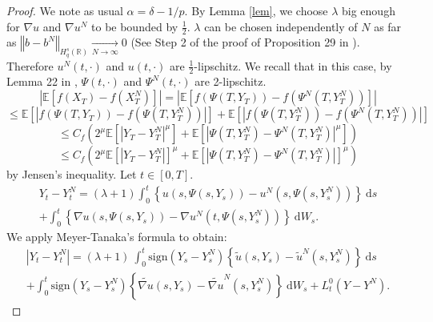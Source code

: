 \documentclass[12pt]{article}
\newcommand{\norme}[1]{\left\Vert #1\right\Vert}
\newcommand{\R}{\mathbb{R}}
\newcommand{\E}{\mathbb{E}}
\newcommand{\di}{\mathrm{d}}
\begin{document}
\begin{proof}
    We note as usual $\alpha = \delta - 1/p$.
    By Lemma \ref{lem}, we choose $\lambda$ big enough for $\nabla u$ and $\nabla u^N$ to be bounded by $\frac{1}{2}$. $\lambda$ can be chosen independently of $N$ as far as $\norme{b - b^N}_{H_q^s(\R)} \underset{N\rightarrow\infty}{\longrightarrow} 0$ (See Step 2 of the proof of Proposition 29 in \cite{Fla-Iss-Rus-2017}). Therefore $u^N(t,\cdot)$ and $u(t,\cdot)$ are $\frac{1}{2}$-lipschitz. We recall that in this case, by Lemma 22 in \cite{Fla-Iss-Rus-2017}, $\Psi(t,\cdot)$ and $\Psi^N(t,\cdot)$ are 2-lipschitz.    
    \begin{equation*}
    \left|\E\left[f\left(X_T\right)-f\left(X_T^N\right)\right]\right| = \left|\E\left[f\left(\Psi\left(T,Y_T\right)\right)-f\left(\Psi^N\left(T,Y_T^N\right)\right)\right]\right|
    \end{equation*}   
    \begin{equation*}
    \leq  \E\left[\left|f\left(\Psi\left(T,Y_T\right)\right)-f\left(\Psi\left(T,Y_T^N\right)\right)\right|\right]+\E\left[\left|f\left(\Psi\left(T,Y_T^N\right)\right)-f\left(\Psi^N\left(T,Y_T^N\right)\right)\right|\right]
    \end{equation*}  
    \begin{equation*}
    \leq C_f  \left(2^\mu\E\left[\left|Y_T-Y_T^N\right|^\mu\right]+\E\left[\left|\Psi\left(T,Y_T^N\right)-\Psi^N\left(T,Y_T^N\right)\right|^\mu\right]\right)
    \end{equation*}
    \begin{equation}\label{jensen}
    \leq C_f  \left(2^\mu\E\left[\left|Y_T-Y_T^N\right|\right]^\mu+\E\left[\left|\Psi\left(T,Y_T^N\right)-\Psi^N\left(T,Y_T^N\right)\right|\right]^\mu\right)
    \end{equation}    
    by Jensen's inequality. Let $t\in[0,T]$. 
    \begin{multline*}
    Y_t-Y_t^N = (\lambda + 1 )\int_0^t\left\{u\left(s,\Psi\left(s,Y_s\right)\right)-u^N\left(s,\Psi\left(s,Y_s^N\right)\right)\right\}\ \di s\\ + \int_0^t\left\{\nabla u\left(s,\Psi\left(s,Y_s\right)\right)-\nabla u^N\left(t,\Psi\left(s,Y_s^N\right)\right)\right\}\ \di W_s.
    \end{multline*}
    We apply Meyer-Tanaka's formula to obtain:
    \begin{multline*}
    \left|Y_t-Y_t^N\right| = (\lambda + 1)\ \int_0^t\mathrm{sign}(Y_s-Y_s^N)\left\{\tilde{u}\left(s,Y_s\right)-\tilde{u}^N\left(s,Y_s^N\right)\right\}\ \di s\\ + \int_0^t\mathrm{sign}(Y_s-Y_s^N)\left\{\widetilde{\nabla u}\left(s,Y_s\right)-\widetilde{\nabla u}^N\left(s,Y_s^N\right)\right\}\ \di W_s + L_t^0(Y-Y^N).

\end{multline*}
\end{proof}
\end{document}
